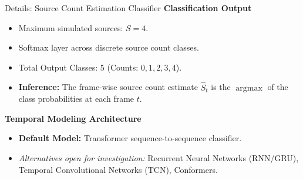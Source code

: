 \documentclass[8pt,hyperref={pdfpagelabels=true},xcolor=table,aspectratio=169]{beamer}
\DeclareMathOperator*{\argmax}{argmax}
\begin{document}
\begin{frame}{Details: Source Count Estimation Classifier}
    \textbf{Classification Output}
    \begin{itemize}
        \item Maximum simulated sources: $S = 4$.
        \item Softmax layer across discrete source count classes.
        \item Total Output Classes: $5$ (Counts: $0, 1, 2, 3, 4$).
        \item \textbf{Inference:} The frame-wise source count estimate $\widehat{S}_t$ is the $\argmax$ of the class probabilities at each frame $t$.
    \end{itemize}
    \textbf{Temporal Modeling Architecture}
    \begin{itemize}
        \item \textbf{Default Model:} Transformer sequence-to-sequence classifier.
        \item \textit{Alternatives open for investigation:} Recurrent Neural Networks (RNN/GRU), Temporal Convolutional Networks (TCN), Conformers.
    \end{itemize}
    \vspace{1em}
\end{frame}
\end{document}

